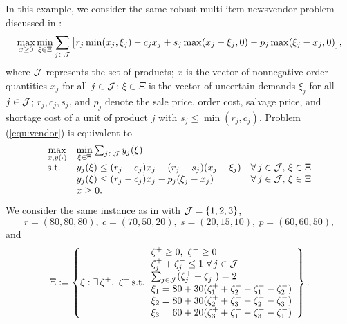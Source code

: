 \documentclass[12pt]{article}
\DeclareMathOperator{\st}{s.t.}
\begin{document}
\begin{onehalfspace}
In this example, we consider the same robust multi-item newsvendor
problem discussed in \cite{Ardestani-Jaafari.Delage.2016}:
%
\begin{equation} \label{equ:vendor}
\max \limits_{x \ge 0} \min \limits_{\xi \in \Xi} \sum_{j \in {\cal J}}
\big[
    r_j \min(x_j, \xi_j) -c_j x_j + s_j \max (x_j - \xi_j, 0) - p_j \max (\xi_j - x_j, 0)
\big],
\end{equation}
%
where ${\cal J}$ represents the set of products; $x$ is the vector of
nonnegative order quantities $x_j$ for all $j \in {\cal J}$; $\xi \in
\Xi$ is the vector of uncertain demands $\xi_j$ for all $j \in {\cal
J}$; $r_j, c_j, s_j$, and $p_j$ denote the sale price, order cost,
salvage price, and shortage cost of a unit of product $j$ with $s_j \le
\min(r_j, c_j)$. Problem (\ref{equ:vendor}) is equivalent to
%
\begin{equation} \label{equ:two-stage-vendor}
\begin{array}{lll}
\max \limits_{x, y(\cdot)} & \min \limits_{\xi \in \Xi} \sum_{j \in {\cal J}} y_j(\xi) & \\
\st & y_j(\xi) \le (r_j - c_j) x_j - (r_j - s_j)(x_j - \xi_j) & \forall \, j \in {\cal J}, \, \xi \in \Xi \\  
     & y_j(\xi) \le (r_j - c_j)x_j - p_j(\xi_j - x_j) &  \forall \, j \in {\cal J}, \, \xi \in \Xi \\
     & x \ge 0. 
\end{array}
\end{equation}
We consider the same instance as in \cite{Ardestani-Jaafari.Delage.2016}
with ${\cal J} = \{1,2,3\}$, 
\[
r = (80, 80, 80), \ c = (70, 50, 20), \ s = (20, 15, 10), \ p =(60, 60, 50),
\]
and
\[
\Xi := \left\{ \xi : \exists \, \zeta^+, \ \zeta^- \st
\begin{array}{l} 
\zeta^+ \ge 0, \ \zeta^- \ge 0 \\
 \zeta^+_j + \zeta^-_j \le 1  \ \forall \, j \in {\cal J} \\ 
 \sum_{j \in {\cal J}} (\zeta^+_j + \zeta^-_j) = 2 \\
 \xi_1 = 80 + 30(\zeta_1^+ + \zeta_2^+ - \zeta_1^- - \zeta_2^-) \\
 \xi_2 = 80 + 30(\zeta_2^+ + \zeta_3^+ - \zeta_2^- - \zeta_3^-) \\
 \xi_3 = 60 + 20(\zeta_3^+ + \zeta_1^+ - \zeta_3^- - \zeta_1^-) 
  \end{array} \right\}.
\]


\end{onehalfspace}
\end{document}
